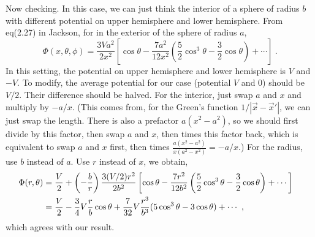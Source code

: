 \documentclass[12pt]{article}
\begin{document}
Now checking. In this case, we can just think the interior of a sphere of radius $b$ with different potential on upper hemisphere and lower hemisphere. From eq(2.27) in Jackson, for in the exterior of the sphere of radius $a$,
\begin{equation}
    \Phi(x, \theta, \phi) = \frac{3Va^2}{2x^2} \left[\cos \theta - \frac{7a^2}{12x^2}\left(\frac{5}{2} \cos^3 \theta - \frac{3}{2} \cos \theta\right) + \cdots\right]~.
\end{equation}
In this setting, the potential on upper hemisphere and lower hemisphere is $V$ and $-V$. To modify, the average potential for our case (potential $V$ and $0$) should be $V /2$. Their difference should be halved. For the interior, just swap $a$ and $x$ and multiply by $- a/x$. (This comes from, for the Green's function $1/|\vec x - \vec x'|$, we can just swap the length. There is also a prefactor $a(x^2 - a^2)$, so we should first divide by this factor, then swap $a$ and $x$, then times this factor back, which is equivalent to swap $a$ and $x$ first, then times $\frac{a(x^2 - a^2)}{x(a^2 - x^2)}= - a/x$.) For the radius, use $b$ instead of $a$. Use $r$ instead of $x$, we obtain,
\begin{align}
    \Phi(r, \theta) &= \frac V2 + \left(- \frac{b}{r}\right)\frac{3(V/2)r^2}{2 b^2}\left[\cos \theta - \frac{7r^2}{12b^2}\left(\frac{5}{2} \cos^3 \theta - \frac{3}{2} \cos \theta\right) + \cdots\right]\cr
    &= \frac V2 - \frac{3}{4} V \frac{r}{b}\cos \theta + \frac{7}{32} V \frac{r^3}{b^3} (5 \cos^3 \theta - 3\cos \theta)+\cdots~,
\end{align}
which agrees with our result.
\end{document}
